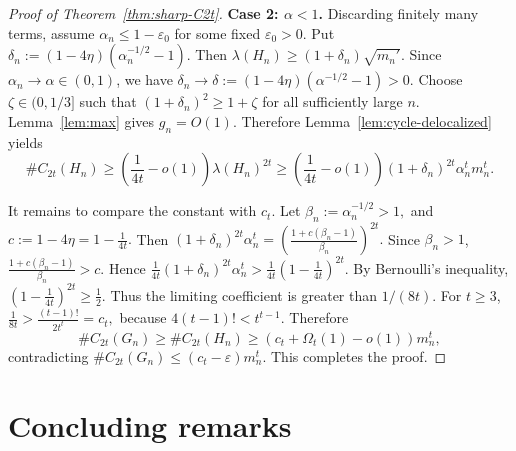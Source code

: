 \documentclass[10pt,a4paper]{amsart}
\begin{document}
\begin{proof}[Proof of Theorem~\ref{thm:sharp-C2t}]
\smallskip
\noindent\textbf{Case 2: \(\alpha<1\).}
Discarding finitely many terms, assume
$\alpha_n\le 1-\varepsilon_0
$
for some fixed \(\varepsilon_0>0\).  Put
$        \delta_n:=(1-4\eta)(\alpha_n^{-1/2}-1).
$
Then
$        \lambda(H_n)\ge (1+\delta_n)\sqrt{m_n'}.$
Since \(\alpha_n\to\alpha\in(0,1)\), we have
$        \delta_n\to\delta:=(1-4\eta)(\alpha^{-1/2}-1)>0.
$
Choose \(\zeta\in(0,1/3]\) such that
$        (1+\delta_n)^2\ge 1+\zeta
$
for all sufficiently large \(n\).  Lemma~\ref{lem:max} gives
\(g_n=O(1)\).  Therefore Lemma~\ref{lem:cycle-delocalized} yields
\[
        \texttt{\#}C_{2t}(H_n)
        \ge
        \left(\frac{1}{4t}-o(1)\right)\lambda(H_n)^{2t} \ge
        \left(\frac{1}{4t}-o(1)\right)
        (1+\delta_n)^{2t}\alpha_n^t m_n^t.
\]

It remains to compare the constant with \(c_t\).  Let
$\beta_n:=\alpha_n^{-1/2}>1,$ and $
        c:=1-4\eta=1-\frac{1}{4t}.$
Then
$        (1+\delta_n)^{2t}\alpha_n^t
        =
        \left(\frac{1+c(\beta_n-1)}{\beta_n}\right)^{2t}.$
Since \(\beta_n>1\),
$        \frac{1+c(\beta_n-1)}{\beta_n}>c.
$
Hence
$        \frac{1}{4t}(1+\delta_n)^{2t}\alpha_n^t
        >
        \frac{1}{4t}\left(1-\frac{1}{4t}\right)^{2t}.$
By Bernoulli's inequality,
$        \left(1-\frac{1}{4t}\right)^{2t}\ge \frac12.
$
Thus the limiting coefficient is greater than \(1/(8t)\).  For
\(t\ge3\),
$        \frac{1}{8t}>\frac{(t-1)!}{2t^t}=c_t,
$
because \(4(t-1)!<t^{t-1}\).  Therefore
\[
        \texttt{\#}C_{2t}(G_n)
        \ge
        \texttt{\#}C_{2t}(H_n)
        \ge
        (c_t+\Omega_t(1)-o(1))m_n^t,
\]
contradicting
$        \texttt{\#}C_{2t}(G_n)\le (c_t-\varepsilon)m_n^t.
$
This completes the proof.
\end{proof}

\section{Concluding remarks}
\label{sec:Concluding}
\end{document}
